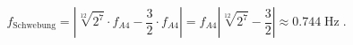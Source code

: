 \begin{equation}
    f_\text{Schwebung}
    =
    \left| \sqrt[12]{2^{7}} \cdot f_{A4} - \frac{3}{2} \cdot f_{A4} \right|
    =
    f_{A4} \left| \sqrt[12]{2^{7}} - \frac{3}{2} \right|
    \approx
    0.744\;\text{Hz}\;. 
\end{equation}
